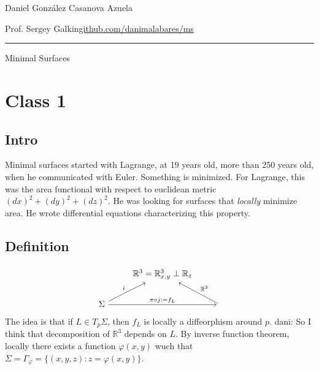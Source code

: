





\begin{minipage}{\textwidth}
	\begin{minipage}{1\textwidth}
		\hfill Daniel González Casanova Azuela
		
		{\small Prof. Sergey Galkin\hfill\href{https://github.com/danimalabares/ms}{github.com/danimalabares/ms}}
	\end{minipage}
\end{minipage}\vspace{.2cm}\hrule
\vspace{1em}
{\Huge Minimal Surfaces}

\tableofcontents

\section{Class 1}

\subsection{Intro}

Minimal surfaces started with Lagrange, at 19 years old, more than 250 years old, when he communicated with Euler. Something is minimized. For Lagrange, this was the area functional with respect to euclidean metric \((dx)^2+(dy)^2+(dz)^2\). He was looking for surfaces that \textit{locally} minimize area. He wrote differential equations characterizing this property.

\subsection{Definition}

\[\begin{tikzcd}
&\mathbb{R}^3=\mathbb{R}^3_{x,y}\perp \mathbb{R}_z\\
\Sigma\arrow[rr,"\pi \circ j:=f_L"]\arrow[ur,"i"]&&\arrow[ul,"\mathbb{R}^2",swap]
\end{tikzcd}\]
The idea is that if \(L \in T_p \Sigma\), then \(f_L\) is locally a diffeorphism around \(p\). {\color{6}dani: So I think that decomposition of \(\mathbb{R}^3\) depends on \(L\).} By inverse function theorem, locally there exists a function \(\varphi(x,y)\) wuch that \(\Sigma=\Gamma_\varphi=\{(x,y,z): z=\varphi(x,y)\}\).


